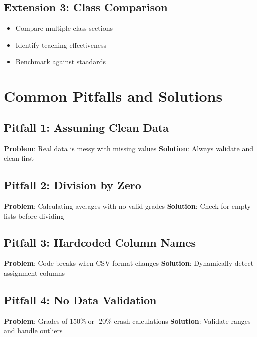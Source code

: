 \documentclass[
  letterpaper,
  DIV=11,
  numbers=noendperiod,
  oneside]{scrreprt}
\providecommand{\tightlist}{%
  \setlength{\itemsep}{0pt}\setlength{\parskip}{0pt}}\usepackage{longtable,booktabs,array}
\begin{document}
\subsection{Extension 3: Class
Comparison}\label{extension-3-class-comparison}

\begin{itemize}
\tightlist
\item
  Compare multiple class sections
\item
  Identify teaching effectiveness
\item
  Benchmark against standards
\end{itemize}

\section{Common Pitfalls and
Solutions}\label{common-pitfalls-and-solutions-2}

\subsection{Pitfall 1: Assuming Clean
Data}\label{pitfall-1-assuming-clean-data-1}

\textbf{Problem}: Real data is messy with missing values
\textbf{Solution}: Always validate and clean first

\subsection{Pitfall 2: Division by
Zero}\label{pitfall-2-division-by-zero}

\textbf{Problem}: Calculating averages with no valid grades
\textbf{Solution}: Check for empty lists before dividing

\subsection{Pitfall 3: Hardcoded Column
Names}\label{pitfall-3-hardcoded-column-names}

\textbf{Problem}: Code breaks when CSV format changes \textbf{Solution}:
Dynamically detect assignment columns

\subsection{Pitfall 4: No Data
Validation}\label{pitfall-4-no-data-validation}

\textbf{Problem}: Grades of 150\% or -20\% crash calculations
\textbf{Solution}: Validate ranges and handle outliers
\end{document}
